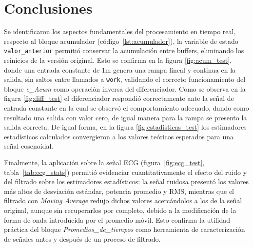\documentclass[twocolumn]{IEEEtran}
\begin{document}
\section{Conclusiones}
Se identificaron los aspectos fundamentales del procesamiento en tiempo real, respecto al bloque acumulador (código~\ref{lst:acumulador}), la variable de 
estado \texttt{valor\_anterior} permitió conservar la acumulación entre buffers, 
eliminando los reinicios de la versión original. Esto se confirma en la 
figura \ref{fig:acum_test}, donde una entrada constante de 1m genera una rampa 
lineal y continua en la salida, sin saltos entre llamados a \texttt{work}, 
validando el correcto funcionamiento del bloque \textit{e\_Acum} como operación 
inversa del diferenciador.
Como se observa en la figura \ref{fig:diff_test} el 
diferenciador respondió correctamente ante la señal de entrada constante en la cual se observó el comportamiento adecuado, dando como resultado una salida con valor cero, de igual manera para la rampa se presento la salida correcta. De igual forma, en la figura 
\ref{fig:estadisticas_test} los estimadores estadísticos calculados convergieron 
a los valores teóricos esperados para una señal cosenoidal.


    Finalmente, la aplicación sobre la señal ECG (figura~\ref{fig:ecg_test}, 
tabla~\ref{tab:ecg_stats}) permitió evidenciar cuantitativamente el efecto del 
ruido y del filtrado sobre los estimadores estadísticos: la señal ruidosa 
presentó los valores más altos de desviación estándar, potencia promedio y RMS, 
mientras que el filtrado con \textit{Moving Average} redujo dichos valores 
acercándolos a los de la señal original, aunque sin recuperarlos por completo, 
debido a la modificación de la forma de onda introducida por el promedio móvil. 
Esto confirma la utilidad práctica del bloque \textit{Promedios\_de\_tiempos} 
como herramienta de caracterización de señales antes y después de un proceso de 
filtrado.




\nocite{*}



\end{document}
